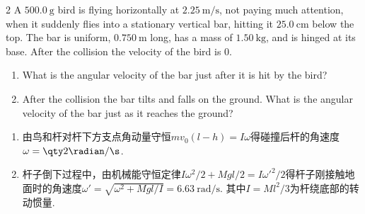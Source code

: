 \begin{problem}
\begin{paracol}{2}
    A $\qty{500.0}{\g}$ bird is flying horizontally at $\qty{2.25}{\m/\s}$, not paying much attention, when it suddenly flies into a stationary vertical bar, hitting it $\qty{25.0}{\cm}$ below the top. The bar is uniform, $\qty{0.750}{\m}$ long, has a mass of $\qty{1.50}{\kg}$, and is hinged at its base. After the collision the velocity of the bird is $0$.
    \switchcolumn\vspace*{\fill}\centering
    \vspace*{\fill}
\end{paracol}
\begin{enumerate}
    \item What is the angular velocity of the bar just after it is hit by the bird?
    \item After the collision the bar tilts and falls on the ground. What is the angular velocity of the bar just as it reaches the ground?
\end{enumerate}
\end{problem}
\begin{solution}\leavevmode
    \begin{enumerate}
        \item 由鸟和杆对杆下方支点角动量守恒$mv_0(l-h)=I\omega$得碰撞后杆的角速度$\omega=\qty2{\radian/\s}$.
        \item 杆子倒下过程中，由机械能守恒定律$I\omega^2/2+Mgl/2=I\omega'^2/2$得杆子刚接触地面时的角速度$\omega'=\sqrt{\omega^2+Mgl/I}=\qty{6.63}{\radian/\s}$. 其中$I=Ml^2/3$为杆绕底部的转动惯量.
    \end{enumerate}
\end{solution}

